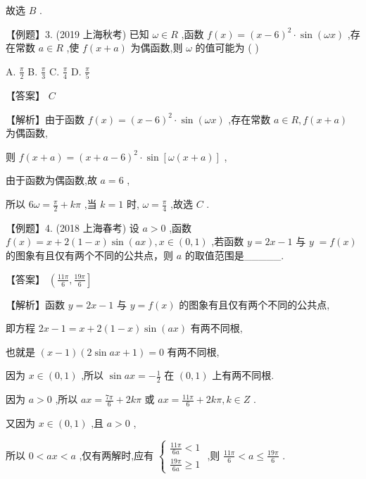 \documentclass[10pt]{article}
\begin{document}
故选 \(B\) .

【例题】3. (2019 上海秋考) 已知 \(\omega  \in  R\) ,函数 \(f\left( x\right)  = {\left( x - 6\right) }^{2} \cdot  \sin \left( {\omega x}\right)\) ,存在常数 \(a \in  R\) ,使 \(f\left( {x + a}\right)\) 为偶函数,则 \(\omega\) 的值可能为 ( )

A. \(\frac{\pi }{2}\) B. \(\frac{\pi }{3}\) C. \(\frac{\pi }{4}\) D. \(\frac{\pi }{5}\)

【答案】 \(C\)

【解析】由于函数 \(f\left( x\right)  = {\left( x - 6\right) }^{2} \cdot  \sin \left( {\omega x}\right)\) ,存在常数 \(a \in  R,f\left( {x + a}\right)\) 为偶函数,

则 \(f\left( {x + a}\right)  = {\left( x + a - 6\right) }^{2} \cdot  \sin \left\lbrack  {\omega \left( {x + a}\right) }\right\rbrack\) ,

由于函数为偶函数,故 \(a = 6\) ,

所以 \({6\omega } = \frac{\pi }{2} + {k\pi }\) ,当 \(k = 1\) 时, \(\omega  = \frac{\pi }{4}\) ,故选 \(C\) .

【例题】4. (2018 上海春考) 设 \(a > 0\) ,函数 \(f\left( x\right)  = x + 2\left( {1 - x}\right) \sin \left( {ax}\right) ,x \in  \left( {0,1}\right)\) ,若函数 \(y = {2x} - 1\) 与 \(y \; = f\left( x\right)\) 的图象有且仅有两个不同的公共点，则 \(a\) 的取值范围是\_\_\_\_\_.

【答案】 \(\left( {\frac{11\pi }{6},\frac{19\pi }{6}}\right\rbrack\)

【解析】函数 \(y = {2x} - 1\) 与 \(y = f\left( x\right)\) 的图象有且仅有两个不同的公共点,

即方程 \({2x} - 1 = x + 2\left( {1 - x}\right) \sin \left( {ax}\right)\) 有两不同根,

也就是 \(\left( {x - 1}\right) \left( {2\sin {ax} + 1}\right)  = 0\) 有两不同根,

因为 \(x \in  \left( {0,1}\right)\) ,所以 \(\sin {ax} =  - \frac{1}{2}\) 在 \(\left( {0,1}\right)\) 上有两不同根.

因为 \(a > 0\) ,所以 \({ax} = \frac{7\pi }{6} + {2k\pi }\) 或 \({ax} = \frac{11\pi }{6} + {2k\pi },k \in  Z\) .

又因为 \(x \in  \left( {0,1}\right)\) ,且 \(a > 0\) ,

所以 \(0 < {ax} < a\) ,仅有两解时,应有 \(\left\{  \begin{array}{l} \frac{11\pi }{6a} < 1 \\  \frac{19\pi }{6a} \geq  1 \end{array}\right.\) ,则 \(\frac{11\pi }{6} < a \leq  \frac{19\pi }{6}\) .
\end{document}
